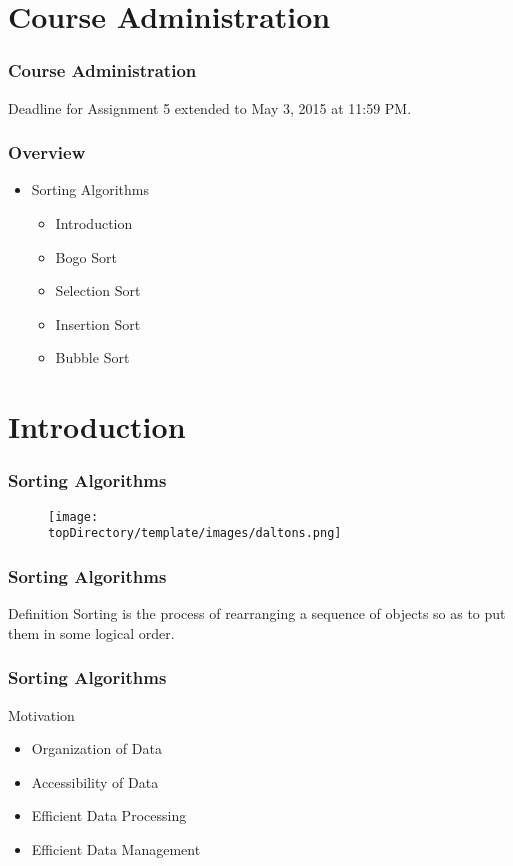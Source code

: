 \documentclass[10pt, compress]{beamer}
\begin{document}
\prepareCover

\section{Course Administration}

\begin{frame}[fragile]
\frametitle{Course Administration}
Deadline for Assignment 5 extended to May 3, 2015 at 11:59 PM.
\end{frame}

\begin{frame}[fragile]
	\frametitle{Overview}
	\begin{itemize}
		\item[] Sorting Algorithms
		\begin{itemize}
			\item[] Introduction
			\item[] Bogo Sort
			\item[] Selection Sort
			\item[] Insertion Sort
			\item[] Bubble Sort
		\end{itemize}
	\end{itemize}
\end{frame}


\section{Introduction}

\begin{frame}[fragile]
	\frametitle{Sorting Algorithms}
	\begin{figure}
		\texttt{[image: \\topDirectory/template/images/daltons.png]}
	\end{figure}
\end{frame}

\begin{frame}[fragile]
	\frametitle{Sorting Algorithms}
	\begin{block}{Definition}
		Sorting is the process of rearranging a sequence of objects so as to put them in some logical order.
	\end{block}
\end{frame}

\begin{frame}[fragile]
	\frametitle{Sorting Algorithms}
	\begin{block}{Motivation}
		\begin{itemize}
			\item[] Organization of Data
			\item[] Accessibility of Data
			\item[] Efficient Data Processing
			\item[] Efficient Data Management
		\end{itemize}
	\end{block}
\end{frame}
\end{document}
